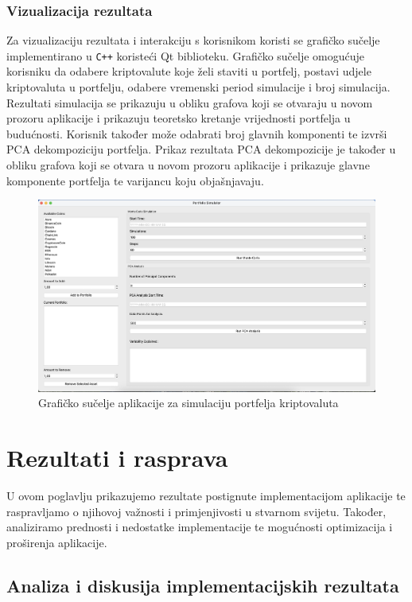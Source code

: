 \documentclass[zavrsnirad]{fer}
\begin{document}
\subsection{Vizualizacija rezultata}
\label{sek:vizualizacija_rezultata}
Za vizualizaciju rezultata i interakciju s korisnikom koristi se
grafičko sučelje implementirano u \texttt{C++} koristeći Qt biblioteku.
Grafičko sučelje omogućuje korisniku da odabere kriptovalute koje želi
staviti u portfelj, postavi udjele kriptovaluta u portfelju,
odabere vremenski period simulacije i broj simulacija.
Rezultati simulacija se prikazuju u obliku grafova koji
se otvaraju u novom prozoru aplikacije i prikazuju teoretsko kretanje
vrijednosti portfelja u budućnosti. Korisnik također može odabrati
broj glavnih komponenti te izvrši PCA dekompoziciju portfelja. Prikaz
rezultata PCA dekompozicije je također u obliku grafova koji
se otvara u novom prozoru aplikacije i prikazuje glavne komponente
portfelja te varijancu koju objašnjavaju.
\begin{figure}[H]
    \centering
    \includegraphics[width=1.0\textwidth]{Figures/gui.png}
    \caption{Grafičko sučelje aplikacije za simulaciju portfelja kriptovaluta}
    \label{fig:portfolio_gui}
\end{figure}

\chapter{Rezultati i rasprava}
\label{pog:rezultati_i_rasprava}
U ovom poglavlju prikazujemo rezultate postignute implementacijom aplikacije
te raspravljamo o njihovoj važnosti i primjenjivosti u stvarnom svijetu.
Također, analiziramo prednosti i nedostatke implementacije te mogućnosti
optimizacija i proširenja aplikacije.
\section{Analiza i diskusija implementacijskih rezultata}
\label{sek:implementacijski_rezultati}
\end{document}
